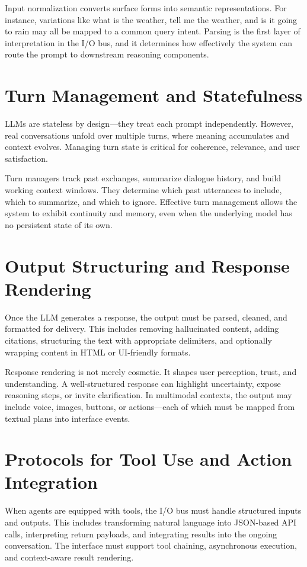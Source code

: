 \documentclass{book}
\begin{document}
Input normalization converts surface forms into semantic representations. For instance, variations like what is the weather, tell me the weather, and is it going to rain may all be mapped to a common query intent. Parsing is the first layer of interpretation in the I/O bus, and it determines how effectively the system can route the prompt to downstream reasoning components.

\section{Turn Management and Statefulness}

LLMs are stateless by design—they treat each prompt independently. However, real conversations unfold over multiple turns, where meaning accumulates and context evolves. Managing turn state is critical for coherence, relevance, and user satisfaction.

Turn managers track past exchanges, summarize dialogue history, and build working context windows. They determine which past utterances to include, which to summarize, and which to ignore. Effective turn management allows the system to exhibit continuity and memory, even when the underlying model has no persistent state of its own.

\section{Output Structuring and Response Rendering}

Once the LLM generates a response, the output must be parsed, cleaned, and formatted for delivery. This includes removing hallucinated content, adding citations, structuring the text with appropriate delimiters, and optionally wrapping content in HTML or UI-friendly formats.

Response rendering is not merely cosmetic. It shapes user perception, trust, and understanding. A well-structured response can highlight uncertainty, expose reasoning steps, or invite clarification. In multimodal contexts, the output may include voice, images, buttons, or actions—each of which must be mapped from textual plans into interface events.

\section{Protocols for Tool Use and Action Integration}

When agents are equipped with tools, the I/O bus must handle structured inputs and outputs. This includes transforming natural language into JSON-based API calls, interpreting return payloads, and integrating results into the ongoing conversation. The interface must support tool chaining, asynchronous execution, and context-aware result rendering.
\end{document}
